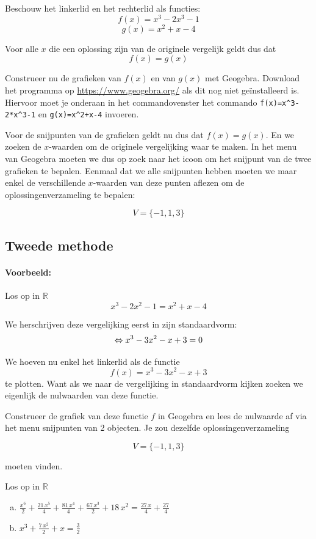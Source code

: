 \documentclass[12pt]{article}
\begin{document}
Beschouw het linkerlid en het rechterlid als functies:
$$f(x)=x^3-2x^3-1$$
$$g(x)=x^2+x-4$$

Voor alle $x$ die een oplossing zijn van de originele vergelijk geldt dus dat
$$f(x)=g(x)$$

Construeer nu de grafieken van $f(x)$ en van $g(x)$ met Geogebra. Download het programma op \url{https://www.geogebra.org/} als dit nog niet geïnstalleerd is. Hiervoor moet je onderaan in het commandovenster het commando \verb#f(x)=x^3-2*x^3-1# en \verb#g(x)=x^2+x-4# invoeren.

Voor de snijpunten van de grafieken geldt nu dus dat $f(x)=g(x)$. En we zoeken de $x$-waarden om de originele vergelijking waar te maken. In het menu van Geogebra moeten we dus op zoek naar het icoon om het snijpunt van de twee grafieken te bepalen. Eenmaal dat we alle snijpunten hebben moeten we maar enkel de verschillende $x$-waarden van deze punten aflezen om de oplossingenverzameling te bepalen:

$$V=\{-1, 1, 3\}$$

\subsection*{Tweede methode}

\paragraph*{Voorbeeld:} Los op in $\mathbb{R}$
$$x^3-2x^2-1=x^2+x-4$$

We herschrijven deze vergelijking eerst in zijn standaardvorm:
$$\Leftrightarrow x^3-3x^2-x + 3=0$$

We hoeven nu enkel het linkerlid als de functie
$$f(x)=x^3-3x^2-x + 3$$
te plotten. Want als we naar de vergelijking in standaardvorm kijken zoeken we eigenlijk de nulwaarden van deze functie.

Construeer de grafiek van deze functie $f$ in Geogebra en lees de nulwaarde af via het menu snijpunten van 2 objecten. Je zou dezelfde oplossingenverzameling

$$V=\{-1, 1, 3\}$$

moeten vinden.

\begin{oefening}
  Los op in $\mathbb{R}$\\
  \begin{enumerate}[(a)]
    \itemsep2em
  \item $\displaystyle\frac{{x}^{6}}{2}+\frac{21\,{x}^{5}}{4}+\frac{81\,{x}^{4}}{4}+\frac{67\,{x}^{3}}{2}+18\,{x}^{2}=\frac{27\,x}{4}+\frac{27}{4}$
  \item $\displaystyle{x}^{3}+\frac{7\,{x}^{2}}{2}+x=\frac{3}{2}$
  \end{enumerate}
\end{oefening}
\end{document}
